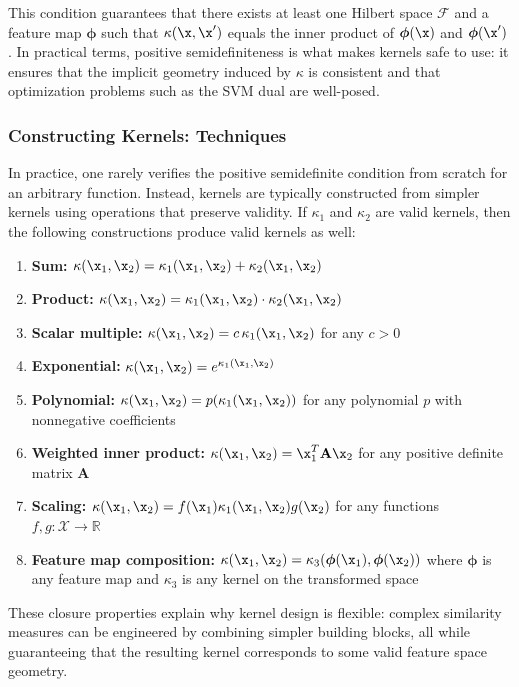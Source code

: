 \medskip

This condition guarantees that there exists at least one Hilbert space $\mathcal{F}$ and a feature map $\boldsymbol{\phi}$ such that $\kappa(\x,\x')$ equals the inner product of $\boldsymbol{\phi}(\x)$ and $\boldsymbol{\phi}(\x')$. In practical terms, positive semidefiniteness is what makes kernels safe to use: it ensures that the implicit geometry induced by $\kappa$ is consistent and that optimization problems such as the SVM dual are well-posed.

\medskip

\subsubsection*{Constructing Kernels: Techniques}

In practice, one rarely verifies the positive semidefinite condition from scratch for an arbitrary function. Instead, kernels are typically constructed from simpler kernels using operations that preserve validity. If $\kappa_1$ and $\kappa_2$ are valid kernels, then the following constructions produce valid kernels as well:
\begin{enumerate}
\item \textbf{Sum:} $\kappa(\x_1,\x_2) = \kappa_1(\x_1,\x_2) + \kappa_2(\x_1,\x_2)$
\item \textbf{Product:} $\kappa(\x_1,\x_2) = \kappa_1(\x_1,\x_2)\cdot \kappa_2(\x_1,\x_2)$
\item \textbf{Scalar multiple:} $\kappa(\x_1,\x_2) = c\,\kappa_1(\x_1,\x_2)$ for any $c>0$
\item \textbf{Exponential:} $\kappa(\x_1,\x_2) = e^{\kappa_1(\x_1,\x_2)}$
\item \textbf{Polynomial:} $\kappa(\x_1,\x_2) = p(\kappa_1(\x_1,\x_2))$ for any polynomial $p$ with nonnegative coefficients
\item \textbf{Weighted inner product:} $\kappa(\x_1,\x_2) = \x_1^T\mathbf{A}\x_2$ for any positive definite matrix $\mathbf{A}$
\item \textbf{Scaling:} $\kappa(\x_1,\x_2) = f(\x_1)\kappa_1(\x_1,\x_2)g(\x_2)$ for any functions $f,g:\mathcal{X}\to\mathbb{R}$
\item \textbf{Feature map composition:} $\kappa(\x_1,\x_2) = \kappa_3(\boldsymbol{\phi}(\x_1),\boldsymbol{\phi}(\x_2))$ where $\boldsymbol{\phi}$ is any feature map and $\kappa_3$ is any kernel on the transformed space
\end{enumerate}

These closure properties explain why kernel design is flexible: complex similarity measures can be engineered by combining simpler building blocks, all while guaranteeing that the resulting kernel corresponds to some valid feature space geometry.

